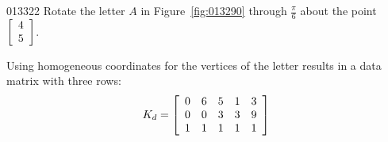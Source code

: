 \begin{example}{}{013322}
Rotate the letter $A$ in Figure~\ref{fig:013290} through $\frac{\pi}{6}$ about the point $\left[
\begin{array}{c}
4\\
5
\end{array}
\right]$.


\begin{solution}
Using homogeneous coordinates for the vertices of the letter results in a data matrix with three rows:
\begin{equation*}
K_{d} =  \left[
\begin{array}{rrrrr}
0 & 6 & 5 & 1 & 3\\
0 & 0 & 3 & 3 & 9 \\
1 & 1 & 1 & 1 & 1
\end{array}
\right]
\end{equation*}

\begin{wrapfigure}[6]{l}{5cm} 
\vspace*{-5em}
\centering

\caption{\label{fig:013335}}
\end{wrapfigure}


\end{solution}
\end{example}
